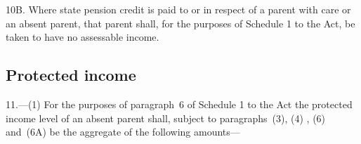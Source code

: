 \documentclass[12pt,a4paper]{article}
\begin{document}
10B.  Where state pension credit is paid to or in respect of a parent with care or an absent parent, that parent shall, for the purposes of Schedule 1 to the Act, be taken to have no assessable income.


\subsection[11. Protected income]{Protected income}

11.—(1) For the purposes of paragraph~6 of Schedule 1 to the Act the protected income level of an absent parent shall, 
subject to paragraphs~(3), (4)%
  , (6) and~(6A)  %
be the aggregate of the following amounts—
\end{document}
